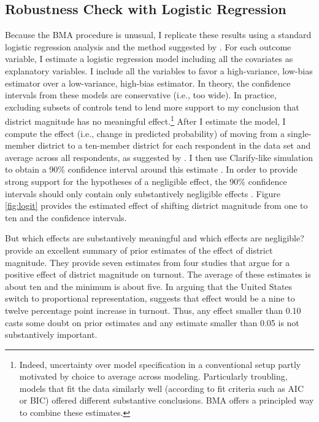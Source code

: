 \documentclass[12pt]{article}
\begin{document}
\subsection*{Robustness Check with Logistic Regression}

Because the BMA procedure is unusual, I replicate these results using a standard logistic regression analysis and the method suggested by \cite{Rainey2014}. For each outcome variable, I estimate a logistic regression model including all the covariates as explanatory variables. I include all the variables to favor a high-variance, low-bias estimator over a low-variance, high-bias estimator. In theory, the confidence intervals from these models are conservative (i.e., too wide). In practice, excluding subsets of controls tend to lend more support to my conclusion that district magnitude has no meaningful effect.\footnote{Indeed, uncertainty over model specification in a conventional setup partly motivated by choice to average across modeling. Particularly troubling, models that fit the data similarly well (according to fit criteria such as AIC or BIC) offered different substantive conclusions. BMA offers a principled way to combine these estimates.} After I estimate the model, I compute the effect (i.e., change in predicted probability) of moving from a single-member district to a ten-member district for each respondent in the data set and average across all respondents, as suggested by \cite{HanmerKalkan2013}. I then use Clarify-like simulation to obtain a 90\% confidence interval around this estimate \citep{KingTomzWittenberg2000}. In order to provide strong support for the hypotheses of a negligible effect, the 90\% confidence intervals should only contain only substantively negligible effects \citep{Rainey2014}. Figure \ref{fig:logit} provides the estimated effect of shifting district magnitude from one to ten and the confidence intervals. 

But which effects are substantively meaningful and which effects are negligible? \cite{BlaisAarts2006} provide an excellent summary of prior estimates of the effect of district magnitude. They provide seven estimates from four studies that argue for a positive effect of district magnitude on turnout. The average of these estimates is about ten and the minimum is about five. In arguing that the United States switch to proportional representation, \cite{Lijphart1997} suggests that effect would be a nine to twelve percentage point increase in turnout. Thus, any effect smaller than 0.10 casts some doubt on prior estimates and any estimate smaller than 0.05 is not substantively important.
\end{document}
